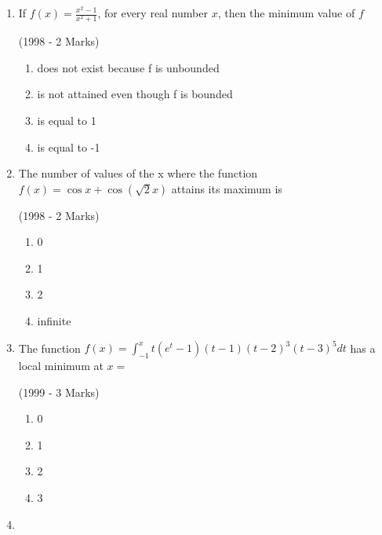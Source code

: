 \documentclass[journal,12pt,twocolumn]{IEEEtran}
\theoremstyle{remark}
\begin{document}
    \begin{enumerate}[start = 7]
    \item{
            If $f(x) = \displaystyle \frac{x^2-1}{x^2+1}$, for every real number $x$, then the minimum value of $f$
            \begin{flushright}
                {(1998 - 2 Marks)}
            \end{flushright}
            \begin{enumerate}
                \item does not exist because f is unbounded
                \item is not attained even though f is bounded
                \item is equal to 1
                \item is equal to -1
            \end{enumerate} }
    \item{
            The number of values of the x where the function $f(x)=\cos x + \cos(\sqrt{2}x)$ attains its maximum is
            \begin{flushright}
                {(1998 - 2 Marks)}
            \end{flushright}
            \begin{enumerate}
                \item 0
                \item 1
                \item 2
                \item infinite
            \end{enumerate}
        }
    \item{
     
            The function $f(x)= \int_{-1}^x t(e^t-1)(t-1)(t-2)^3(t-3)^5dt$ has a local minimum at $x=$
            \begin{flushright}
                {(1999 - 3 Marks)}
            \end{flushright}
            \begin{enumerate}
                \item 0 
                \item 1
                \item 2
                \item 3
            \end{enumerate}
        
        }
    \item{
        
}
\end{enumerate}
\end{document}
